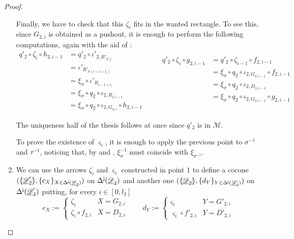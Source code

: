 \begin{proof}
\begin{enumerate}
		Finally, we have to check that this $\zeta_i$ fits in the wanted rectangle. To see this, since $G_{2,i}$ is obtained as a pushout, it is enough to perform the following computations, again with the aid of :
		\[\begin{split}
		q'_2\circ \zeta_i\circ h_{2, i-1}&=q'_2\circ \iota'_{2, R'_{2,j}}\\&=\iota'_{R'_{\sigma(i-1+l_1)}} \\&=\xi_\sigma \circ \iota'_{R_{i-1+l_1}}\\&=\xi_\sigma \circ q_2\circ \iota_{2, R_{2,i-1}}\\&=\xi_\sigma \circ q_2\circ \iota_{2, G_{2,i}}\circ h_{2,i-1}
		\end{split}\qquad \begin{split}
		q'_2\circ \zeta_i\circ g_{2, i-1}&=q'_2\circ \zeta_{i-1}\circ f_{2, i-1}\\&=\xi_\sigma\circ q_2\circ \iota_{2, G_{2,i-1}}\circ f_{2, i-1} \\&=\xi_\sigma \circ q_2\circ \iota_{2, D_{2, i-1}}\\&=\xi_\sigma \circ q_2\circ \iota_{2, G_{2, i-1}}\circ g_{2,i-1}\\&
		\end{split}\]		
	
		The uniqueness half of the thesis follows at once since $q'_2$ is in $\mathcal{M}$. 
		
		To prove the existence of $\varsigma_{i}$, it is enough to apply the previous point to $\sigma^{-1}$ and $\tau^{-1}$, noticing that, by  and , $\xi^{-1}_\sigma$ must coincide with $\xi_{\sigma^{-1}}$.
		
		\item We can use the arrows $\zeta_i$  and $\varsigma_{i}$ constructed in point $1$ to define a cocone $(\langle \hspace{-1.85pt}[ \underline{\mathscr{D}}'_2]\hspace{-1.85pt}\rangle, \{c_X\}_{X\in \Delta^{\hspace{-1pt}\downarrow\hspace{-1pt}}(\underline{\mathscr{D}}_2)})$ on $\Delta^{\hspace{-1pt}\downarrow\hspace{-1pt}}(\underline{\mathscr{D}}_2)$ and another one $(\langle \hspace{-1.85pt}[ \underline{\mathscr{D}}_2]\hspace{-1.85pt}\rangle, \{d_Y\}_{Y\in \Delta^{\hspace{-1pt}\downarrow\hspace{-1pt}}(\underline{\mathscr{D}}'_2)})$ on $\Delta^{\hspace{-1pt}\downarrow\hspace{-1pt}}(\underline{\mathscr{D}}'_2)$  putting, for every $i\in [0, l_2]$
		\[c_X:=\begin{cases}
			\zeta_i & X=G_{2,i}\\
			\zeta_{i} \circ f_{2,i} & X=D_{2,i}
		\end{cases} \qquad d_Y:=\begin{cases}
		\varsigma_i & Y=G'_{2,i}\\
		\varsigma_{i} \circ f'_{2,i} & Y=D'_{2,i}
		\end{cases} \] 
		

\end{enumerate}
\end{proof}
